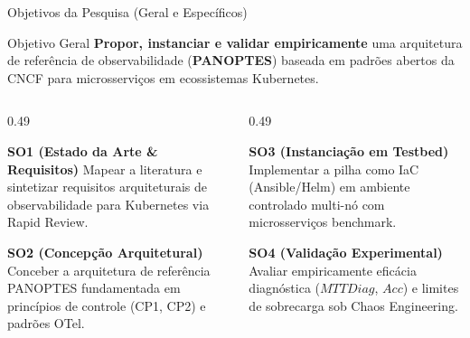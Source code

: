 \documentclass[aspectratio=169, 10pt]{beamer}
\begin{document}
\begin{frame}{Objetivos da Pesquisa (Geral e Específicos)}
  \begin{block}{Objetivo Geral}
    \textbf{Propor, instanciar e validar empiricamente} uma arquitetura de referência de observabilidade (\textbf{PANOPTES}) baseada em padrões abertos da CNCF para microsserviços em ecossistemas Kubernetes.
  \end{block}
  
  \vspace{0.8ex}
  \begin{columns}[T]
    \begin{column}{0.49\textwidth}
      \begin{exampleblock}{\textbf{SO1 (Estado da Arte \& Requisitos)}}
        \small Mapear a literatura e sintetizar requisitos arquiteturais de observabilidade para Kubernetes via Rapid Review.
      \end{exampleblock}
      \vspace{0.5ex}
      \begin{exampleblock}{\textbf{SO2 (Concepção Arquitetural)}}
        \small Conceber a arquitetura de referência PANOPTES fundamentada em princípios de controle (CP1, CP2) e padrões OTel.
      \end{exampleblock}
    \end{column}
    
    \begin{column}{0.49\textwidth}
      \begin{exampleblock}{\textbf{SO3 (Instanciação em Testbed)}}
        \small Implementar a pilha como IaC (Ansible/Helm) em ambiente controlado multi-nó com microsserviços benchmark.
      \end{exampleblock}
      \vspace{0.5ex}
      \begin{exampleblock}{\textbf{SO4 (Validação Experimental)}}
        \small Avaliar empiricamente eficácia diagnóstica ($MTTDiag$, $Acc$) e limites de sobrecarga sob Chaos Engineering.
      \end{exampleblock}
    \end{column}
  \end{columns}
\end{frame}
\end{document}
